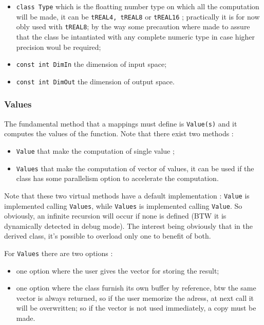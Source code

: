\begin{itemize}
    \item {\tt class Type} which is the floatting number type on which all the computation will be made,
          it can be {\tt tREAL4, tREAL8} or {\tt tREAL16} ;  practically it is for now obly used
          with {\tt tREAL8}; by the way some precaution where made to assure that
          the class be intantiated with any complete numeric type in case higher precision woul be required;


    \item {\tt const int DimIn} the dimension of input space;

    \item {\tt const int DimOut} the dimension of output space.
\end{itemize}

\subsubsection{Values}

The fundamental method that a  mappings must define is  {\tt Value(s)} and it computes the values of 
the function.  Note that there exist two methods :

\begin{itemize}
     \item {\tt Value} that make the computation of single value ;

     \item {\tt Values} that make the computation of vector of values, it can  be used
           if the class has some parallelism option to accelerate the computation.
\end{itemize}

Note that these two virtual methods  have a default implementation : {\tt Value}
is implemented calling {\tt Values},  while {\tt Values} is implemented calling
{\tt Value}.  So obviously, an infinite recursion will occur if none is defined
(BTW it is dynamically detected in debug mode).  The interest being obviously that
in the derived class, it's possible to overload only one to benefit of both.

For {\tt Values} there are two options : 

\begin{itemize}
     \item  one option where the user gives the vector for storing the result;

     \item  one option where the class furnish its own buffer by reference,
            btw the same vector is always returned, so if the user memorize
            the adress, at next call it will be overwritten; so if the vector
            is not used immediately, a copy must be made.
\end{itemize}



